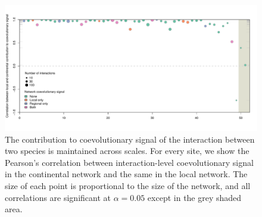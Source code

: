 \documentclass{nature}
\begin{document}
\begin{figure}
\centering
\includegraphics{../figures/figure2.pdf}
\caption{The contribution to coevolutionary signal of the interaction
between two species is maintained across scales. For every site, we show
the Pearson's correlation between interaction-level coevolutionary
signal in the continental network and the same in the local network. The
size of each point is proportional to the size of the network, and all
correlations are significant at $\alpha = 0.05$ except in the grey
shaded area.}
\end{figure}
\end{document}
